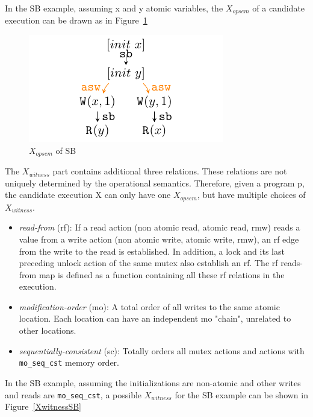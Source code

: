 In the SB example, assuming x and y atomic variables, the $X_{opsem}$ of a candidate execution can be drawn as in Figure~\ref{XopsemSB}

\begin{figure}[htbp] %
	\centering
	\includegraphics[scale=1]{figure/exec-graph/SB1.pdf} %
	\caption{$X_{opsem}$ of SB} %
	\label{XopsemSB} %
\end{figure}

The $X_{witness}$ part contains additional three relations. These relations are not uniquely determined by the operational semantics. Therefore, given a program p, the candidate execution X can only have one $X_{opsem}$, but have multiple choices of $X_{witness}$.

\begin{itemize}
	\item \textit{read-from} (rf): If a read action (non atomic read, atomic read, rmw) reads a value from a write action (non atomic write, atomic write, rmw), an rf edge from the write to the read is established. In addition, a lock and its last preceding unlock action of the same mutex also establish an rf. The rf reads-from map is defined as a function containing all these rf relations in the execution.
	\item \textit{modification-order} (mo): A total order of all writes to the same atomic location. Each location can have an independent mo "chain", unrelated to other locations.
	\item \textit{sequentially-consistent} (sc): Totally orders all mutex actions and actions with \texttt{mo\_seq\_cst} memory order.
\end{itemize}

In the SB example, assuming the initializations are non-atomic and other writes and reads are \texttt{mo\_seq\_cst}, a possible $X_{witness}$ for the SB example can be shown in Figure~\ref{XwitnessSB}

